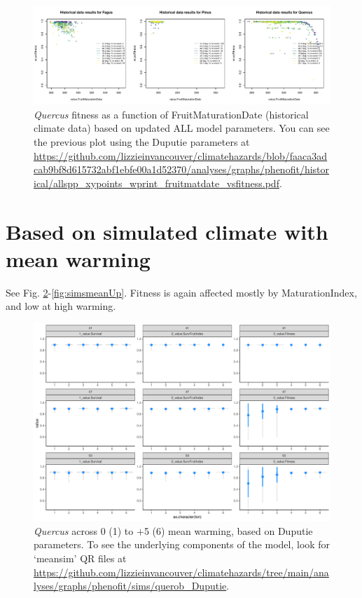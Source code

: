 \documentclass[11pt,letter]{article}
\begin{document}
\begin{figure}[h!]
 \begin{center}
\noindent \includegraphics[width=1\textwidth]{..//analyses/graphs/phenofit/historical/allspp_xypoints_wprint_fruitmatdate_vsfitness.pdf}
  \caption{\emph{Quercus} fitness as a function of FruitMaturationDate (historical climate data) based on updated ALL model parameters. You can see the previous plot using the Duputie parameters at \url{https://github.com/lizzieinvancouver/climatehazards/blob/faaca3adcab9bf8d615732abf1ebfe00a1d52370/analyses/graphs/phenofit/historical/allspp_xypoints_wprint_fruitmatdate_vsfitness.pdf}.}
  \label{fig:fruitmatdate}
  \end{center}
\end{figure}


\clearall
\section*{Based on simulated climate with mean warming}

See Fig. \ref{fig:simsmeanDup}-\ref{fig:simsmeanUp}. Fitness is again affected mostly by MaturationIndex, and low at high warming.

\begin{figure}[h!]
 \begin{center}
\noindent \includegraphics[width=1\textwidth]{..//analyses/graphs/phenofit/sims/querob_Duputie/meansim_3metricsQR.pdf}
  \caption{\emph{Quercus} across 0 (1) to $+$5 (6) mean warming, based on Duputie parameters. To see the underlying components of the model, look for `meansim' QR files at \url{https://github.com/lizzieinvancouver/climatehazards/tree/main/analyses/graphs/phenofit/sims/querob_Duputie}.}
  \label{fig:simsmeanDup}
  \end{center}
\end{figure}
\end{document}
